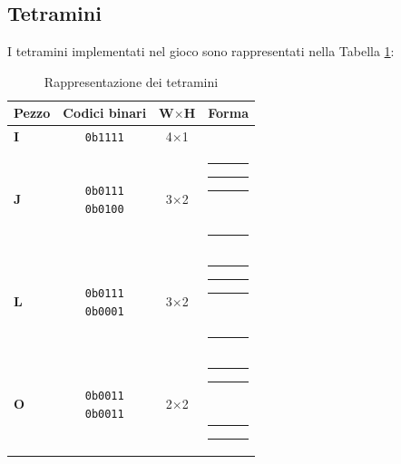 \documentclass[a4paper, 12pt]{article}
\newcommand{\RedBlock}{\colorbox{red}{\rule{1.2ex}{1.2ex}}}      %
\newcommand{\WhiteBlock}{\fcolorbox{black}{white}{\rule{1.2ex}{1.2ex}}} %
\begin{document}
\subsection{Tetramini}
\label{subsec:tetramini}
I tetramini implementati nel gioco sono rappresentati nella Tabella \ref{tab:tetramini}:

\begin{table}[H]
    \centering
    \caption{Rappresentazione dei tetramini}
    \label{tab:tetramini}
    \begin{tabular}{
            >{\bfseries}l   %
            c               %
            c               %
            l               %
        }
        \toprule
        Pezzo & Codici binari                                                                                       & W\(\times\)H & Forma \\
        \midrule
        I     & \makecell{\texttt{0b1111}                                                 \\}
              & 4\(\times\)1
              & \makecell{\RedBlock\RedBlock\RedBlock\RedBlock}                                                                            \\
        \addlinespace
        J     & \makecell{\texttt{0b0111}                                                                                                  \\\texttt{0b0100}}
              & 3\(\times\)2
              & \makecell{\WhiteBlock\RedBlock\RedBlock\RedBlock                                                                           \\\WhiteBlock\WhiteBlock\WhiteBlock\RedBlock} \\
        \addlinespace
        L     & \makecell{\texttt{0b0111}                                                                                                  \\\texttt{0b0001}}
              & 3\(\times\)2
              & \makecell{\RedBlock\RedBlock\RedBlock\WhiteBlock                                                                           \\\RedBlock\WhiteBlock\WhiteBlock\WhiteBlock} \\
        \addlinespace
        O     & \makecell{\texttt{0b0011}                                                                                                  \\\texttt{0b0011}}
              & 2\(\times\)2
              & \makecell{\WhiteBlock\RedBlock\RedBlock\WhiteBlock                                                                         \\\WhiteBlock\RedBlock\RedBlock\WhiteBlock} \\

\end{tabular}
\end{table}
\end{document}
